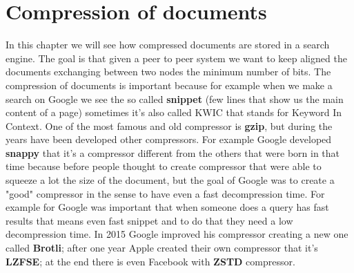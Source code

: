 \chapter{Compression of documents}
In this chapter we will see how compressed documents are stored in a search engine. The goal is that given a peer to peer system we want to keep aligned the documents exchanging between two nodes the minimum number of bits.\newline
The compression of documents is important because for example when we make a search on Google we see the so called \textbf{snippet} (few lines that show us the main content of a page) sometimes it's also called KWIC that stands for Keyword In Context.\newline
One of the most famous and old compressor is \textbf{gzip}, but during the years have been developed other compressors. For example Google developed \textbf{snappy} that it's a compressor different from the others that were born in that time because before people thought to create compressor that were able to squeeze a lot the size of the document, but the goal of Google was to create a "good" compressor in the sense to have even a fast decompression time. For example for Google was important that when someone does a query has fast results that means even fast snippet and to do that they need a low decompression time.\newline
In 2015 Google improved his compressor creating a new one called \textbf{Brotli}; after one year Apple created their own compressor that it's \textbf{LZFSE}; at the end there is even Facebook with \textbf{ZSTD} compressor.\newline
